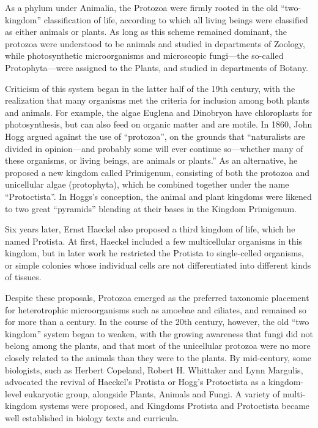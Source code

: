 As a phylum under Animalia, the Protozoa were firmly rooted in the old ``two-kingdom'' classification of life, according to which all living beings were classified as either animals or plants. As long as this scheme remained dominant, the protozoa were understood to be animals and studied in departments of Zoology, while photosynthetic microorganisms and microscopic fungi---the so-called Protophyta---were assigned to the Plants, and studied in departments of Botany.

Criticism of this system began in the latter half of the 19th century, with the realization that many organisms met the criteria for inclusion among both plants and animals. For example, the algae Euglena and Dinobryon have chloroplasts for photosynthesis, but can also feed on organic matter and are motile. In 1860, John Hogg argued against the use of ``protozoa'', on the grounds that ``naturalists are divided in opinion---and probably some will ever continue so---whether many of these organisms, or living beings, are animals or plants.'' As an alternative, he proposed a new kingdom called Primigenum, consisting of both the protozoa and unicellular algae (protophyta), which he combined together under the name ``Protoctista''. In Hoggs's conception, the animal and plant kingdoms were likened to two great ``pyramids'' blending at their bases in the Kingdom Primigenum.

Six years later, Ernst Haeckel also proposed a third kingdom of life, which he named Protista. At first, Haeckel included a few multicellular organisms in this kingdom, but in later work he restricted the Protista to single-celled organisms, or simple colonies whose individual cells are not differentiated into different kinds of tissues.

Despite these proposals, Protozoa emerged as the preferred taxonomic placement for heterotrophic microorganisms such as amoebae and ciliates, and remained so for more than a century. In the course of the 20th century, however, the old ``two kingdom'' system began to weaken, with the growing awareness that fungi did not belong among the plants, and that most of the unicellular protozoa were no more closely related to the animals than they were to the plants. By mid-century, some biologists, such as Herbert Copeland, Robert H. Whittaker and Lynn Margulis, advocated the revival of Haeckel's Protista or Hogg's Protoctista as a kingdom-level eukaryotic group, alongside Plants, Animals and Fungi. A variety of multi-kingdom systems were proposed, and Kingdoms Protista and Protoctista became well established in biology texts and curricula.

